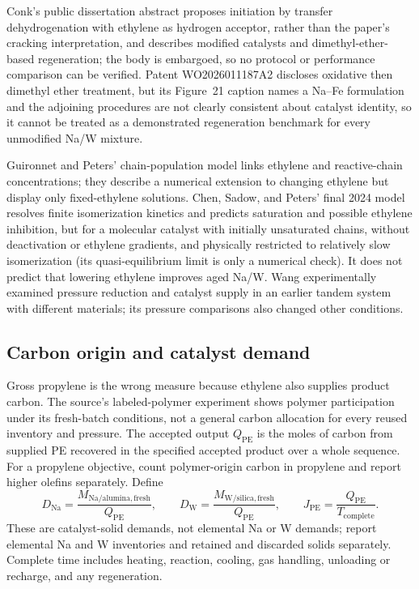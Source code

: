 Conk's public dissertation abstract proposes initiation by transfer dehydrogenation with ethylene as hydrogen acceptor, rather than the paper's cracking interpretation, and describes modified catalysts and dimethyl-ether-based regeneration; the body is embargoed, so no protocol or performance comparison can be verified.\cite{conk2025thesis} Patent WO2026011187A2 discloses oxidative then dimethyl ether treatment, but its Figure~21 caption names a Na--Fe formulation and the adjoining procedures are not clearly consistent about catalyst identity, so it cannot be treated as a demonstrated regeneration benchmark for every unmodified Na/W mixture.\cite{hartwig2026patent}

Guironnet and Peters' chain-population model links ethylene and reactive-chain concentrations; they describe a numerical extension to changing ethylene but display only fixed-ethylene solutions.\cite{guironnet2020} Chen, Sadow, and Peters' final 2024 model resolves finite isomerization kinetics and predicts saturation and possible ethylene inhibition, but for a molecular catalyst with initially unsaturated chains, without deactivation or ethylene gradients, and physically restricted to relatively slow isomerization (its quasi-equilibrium limit is only a numerical check). It does not predict that lowering ethylene improves aged Na/W.\cite{chen2024} Wang experimentally examined pressure reduction and catalyst supply in an earlier tandem system with different materials; its pressure comparisons also changed other conditions.\cite[ch.~4]{wang2022thesis}

\subsection{Carbon origin and catalyst demand}

Gross propylene is the wrong measure because ethylene also supplies product carbon. The source's labeled-polymer experiment shows polymer participation under its fresh-batch conditions, not a general carbon allocation for every reused inventory and pressure.\cite[Fig.~4A]{conk2024} The accepted output $Q_{\mathrm{PE}}$ is the moles of carbon from supplied PE recovered in the specified accepted product over a whole sequence. For a propylene objective, count polymer-origin carbon in propylene and report higher olefins separately. Define
\begin{equation}
 D_{\mathrm{Na}}=\frac{M_{\mathrm{Na/alumina,fresh}}}{Q_{\mathrm{PE}}},\qquad
 D_{\mathrm{W}}=\frac{M_{\mathrm{W/silica,fresh}}}{Q_{\mathrm{PE}}},\qquad
 J_{\mathrm{PE}}=\frac{Q_{\mathrm{PE}}}{T_{\mathrm{complete}}}.
 \label{eq:polymer-demand}
\end{equation}
These are catalyst-solid demands, not elemental Na or W demands; report elemental Na and W inventories and retained and discarded solids separately. Complete time includes heating, reaction, cooling, gas handling, unloading or recharge, and any regeneration.

